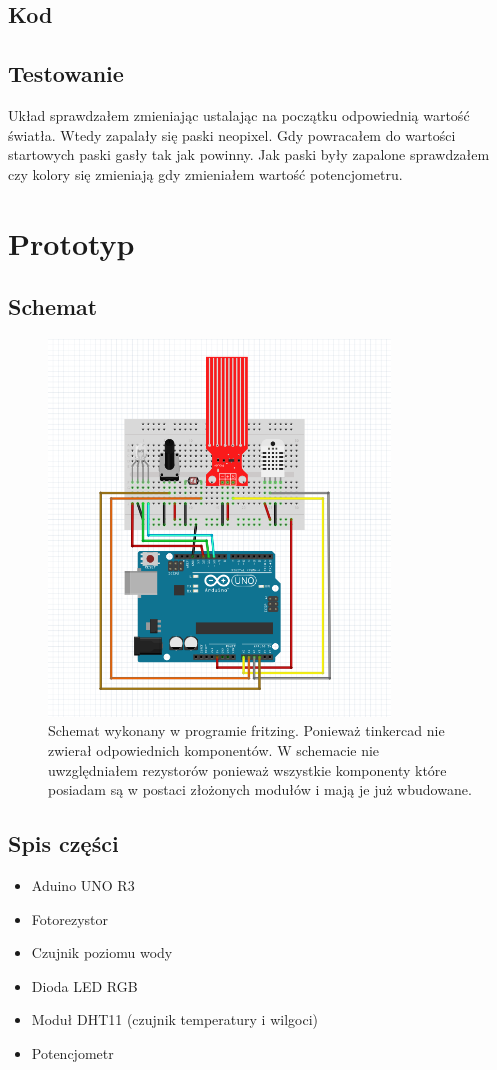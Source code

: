 \documentclass[a4paper,11pt]{uzreport}
\begin{document}
\subsection{Kod}
\begin{center}
\end{center}
\subsection{Testowanie}
Układ sprawdzałem zmieniając ustalając na początku odpowiednią wartość światła. Wtedy zapalały się paski neopixel. Gdy powracałem do wartości startowych paski gasły tak jak powinny. Jak paski były zapalone sprawdzałem czy kolory się zmieniają gdy zmieniałem wartość potencjometru.
\section{Prototyp}
\subsection{Schemat}
\begin{figure}[!h]
    \centering
    \includegraphics[height=10cm]{listings/uklad2.png}
    \caption{Schemat wykonany w programie fritzing. Ponieważ tinkercad nie zwierał odpowiednich komponentów. W schemacie nie uwzględniałem rezystorów ponieważ wszystkie komponenty które posiadam są w postaci złożonych modułów i mają je już wbudowane.}
    \label{fig:my_label}
\end{figure}
\subsection{Spis części}
\begin{itemize}
    \item Aduino UNO R3
    \item Fotorezystor
    \item Czujnik poziomu wody
    \item Dioda LED RGB
    \item Moduł DHT11 (czujnik temperatury i wilgoci)
    \item Potencjometr
\end{itemize}
\end{document}
